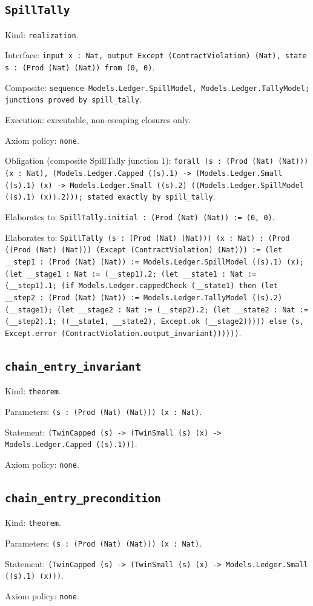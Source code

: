 \documentclass[11pt]{article}
\begin{document}
\subsection*{\texttt{SpillTally}}
\noindent Kind: \texttt{realization}.\par
\noindent Interface: \texttt{input x : Nat, output Except (ContractViolation) (Nat), state s : (Prod (Nat) (Nat)) from (0, 0)}.\par
\noindent Composite: \texttt{sequence Models.Ledger.SpillModel, Models.Ledger.TallyModel; junctions proved by spill\_tally}.\par
\noindent Execution: executable, non-escaping closures only.\par
\noindent Axiom policy: \texttt{none}.\par
\noindent Obligation (composite SpillTally junction 1): \texttt{forall (s : (Prod (Nat) (Nat))) (x : Nat), (Models.Ledger.Capped ((s).1) -> (Models.Ledger.Small ((s).1) (x) -> Models.Ledger.Small ((s).2) ((Models.Ledger.SpillModel ((s).1) (x)).2))); stated exactly by spill\_tally}.\par
\noindent Elaborates to: \texttt{SpillTally.initial : (Prod (Nat) (Nat)) := (0, 0)}.\par
\noindent Elaborates to: \texttt{SpillTally (s : (Prod (Nat) (Nat))) (x : Nat) : (Prod ((Prod (Nat) (Nat))) (Except (ContractViolation) (Nat))) := (let \_\_step1 : (Prod (Nat) (Nat)) := Models.Ledger.SpillModel ((s).1) (x); (let \_\_stage1 : Nat := (\_\_step1).2; (let \_\_state1 : Nat := (\_\_step1).1; (if Models.Ledger.cappedCheck (\_\_state1) then (let \_\_step2 : (Prod (Nat) (Nat)) := Models.Ledger.TallyModel ((s).2) (\_\_stage1); (let \_\_stage2 : Nat := (\_\_step2).2; (let \_\_state2 : Nat := (\_\_step2).1; ((\_\_state1, \_\_state2), Except.ok (\_\_stage2))))) else (s, Except.error (ContractViolation.output\_invariant))))))}.\par
\subsection*{\texttt{chain\_entry\_invariant}}
\noindent Kind: \texttt{theorem}.\par
\noindent Parameters: \texttt{(s : (Prod (Nat) (Nat))) (x : Nat)}.\par
\noindent Statement: \texttt{(TwinCapped (s) -> (TwinSmall (s) (x) -> Models.Ledger.Capped ((s).1)))}.\par
\noindent Axiom policy: \texttt{none}.\par
\subsection*{\texttt{chain\_entry\_precondition}}
\noindent Kind: \texttt{theorem}.\par
\noindent Parameters: \texttt{(s : (Prod (Nat) (Nat))) (x : Nat)}.\par
\noindent Statement: \texttt{(TwinCapped (s) -> (TwinSmall (s) (x) -> Models.Ledger.Small ((s).1) (x)))}.\par
\noindent Axiom policy: \texttt{none}.\par
\end{document}

